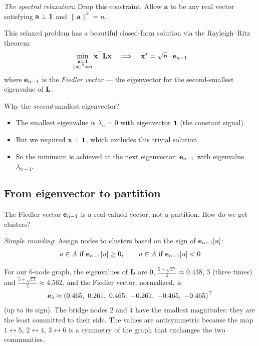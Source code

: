 \begin{notechapter}
\begin{keyidea}
\emph{The spectral relaxation}: Drop this constraint. Allow $\mathbf{a}$ to be any real vector satisfying $\mathbf{a} \perp \mathbf{1}$ and $\|\mathbf{a}\|^2 = n$.

This relaxed problem has a beautiful closed-form solution via the Rayleigh--Ritz theorem:
\[
\min_{\substack{\mathbf{x} \perp \mathbf{1} \\ \|\mathbf{x}\|^2 = n}} \mathbf{x}^\top \mathbf{L} \mathbf{x} \quad \Longrightarrow \quad \mathbf{x}^* = \sqrt{n} \cdot \mathbf{e}_{n-1}
\]
where $\mathbf{e}_{n-1}$ is the \emph{Fiedler vector} --- the eigenvector for the second-smallest eigenvalue of $\mathbf{L}$.
\end{keyidea}

\begin{intuition}
Why the \emph{second}-smallest eigenvector?
\begin{itemize}
    \item The smallest eigenvalue is $\lambda_n = 0$ with eigenvector $\mathbf{1}$ (the constant signal).
    \item But we required $\mathbf{x} \perp \mathbf{1}$, which excludes this trivial solution.
    \item So the minimum is achieved at the next eigenvector: $\mathbf{e}_{n-1}$ with eigenvalue $\lambda_{n-1}$.
\end{itemize}
\end{intuition}

\subsection{From eigenvector to partition}

The Fiedler vector $\mathbf{e}_{n-1}$ is a real-valued vector, not a partition. How do we get clusters?

\begin{keyidea}
\emph{Simple rounding}: Assign nodes to clusters based on the sign of $\mathbf{e}_{n-1}[u]$:
\[
u \in A \text{ if } \mathbf{e}_{n-1}[u] \geq 0, \qquad u \in \bar{A} \text{ if } \mathbf{e}_{n-1}[u] < 0
\]
\end{keyidea}

\begin{example}
For our 6-node graph, the eigenvalues of $\mathbf{L}$ are $0$, $\frac{5 - \sqrt{17}}2\approx0.438$, $3$ (three times) and $\frac{5 + \sqrt{17}}2\approx4.562$, and the
Fiedler vector, normalized, is
\[
\be_5\approx(0.465,\ 0.261,\ 0.465,\ -0.261,\ -0.465,\ -0.465)^\top
\]
(up to its sign). The bridge nodes $2$ and $4$ have the smallest magnitudes: they are the least
committed to their side. The values are antisymmetric because the map $1\leftrightarrow5$, $2\leftrightarrow4$, $3\leftrightarrow6$ is a symmetry of the
graph that exchanges the two communities.


\end{example}
\end{notechapter}

